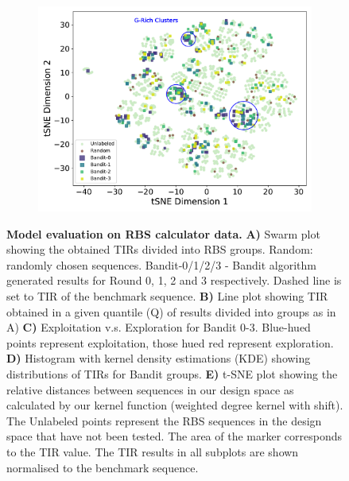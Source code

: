 \documentclass{scrartcl}[2013/05/29]%
\begin{document}
\begin{figure}[!ht]
\begin{subfigure}[b]{0.48\textwidth}
    \end{subfigure}
    \begin{subfigure}[b]{0.48\textwidth}
        \centering
        \caption{}
        \includegraphics[scale=0.42]{plots/Supplementary/tsneplot_salis.pdf}
    \end{subfigure}
    \caption{
    \textbf{Model evaluation on RBS calculator data.}
    \textbf{A)} Swarm plot showing the obtained TIRs divided into RBS groups.
    Random: randomly chosen sequences.
    Bandit-0/1/2/3 - Bandit algorithm generated results for Round 0, 1, 2 and 3 respectively.
    Dashed line is set to TIR of the benchmark sequence.
    \textbf{B)} Line plot showing TIR obtained in a given quantile (Q) of results divided into groups as in A)
    \textbf{C)} Exploitation v.s. Exploration for Bandit 0-3. Blue-hued points represent exploitation, those hued red represent exploration.
    \textbf{D)} Histogram with kernel density estimations (KDE) showing distributions of TIRs for Bandit groups.
    \textbf{E)} t-SNE plot showing the relative distances between sequences in our design space as calculated by our kernel function (weighted degree kernel with shift).
    The Unlabeled points represent the RBS sequences in the design space that have not been tested.
    The area of the marker corresponds to the TIR value.
    The TIR results in all subplots are shown normalised to the  benchmark sequence.}
    \label{fig: Swarmplot and Quantplot Salis}
\end{figure}
\end{document}
